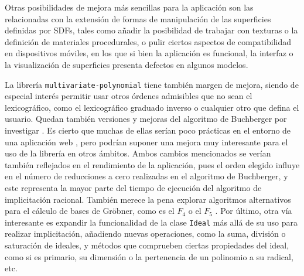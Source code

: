 Otras posibilidades de mejora más sencillas para la aplicación son las relacionadas con la extensión de formas de manipulación de las superficies definidas por SDFs, tales como añadir la posibilidad de trabajar con texturas o la definición de materiales procedurales, o pulir ciertos aspectos de compatibilidad en dispositivos móviles, en los que si bien la aplicación es funcional, la interfaz o la visualización de superficies presenta defectos en algunos modelos.\newline

La librería \texttt{multivariate-polynomial} tiene también margen de mejora, siendo de especial interés permitir usar otros órdenes admisibles que no sean el lexicográfico, como el lexicográfico graduado inverso o cualquier otro que defina el usuario. Quedan también versiones y mejoras del algoritmo de Buchberger por investigar \cite{conc1,conc2,conc3,conc4}. Es cierto que muchas de ellas serían poco prácticas en el entorno de una aplicación web \cite{conc5}, pero podrían suponer una mejora muy interesante para el uso de la librería en otros ámbitos. Ambos cambios mencionados se verían también reflejados en el rendimiento de la aplicación, pues el orden elegido influye en el número de reducciones a cero realizadas en el algoritmo de Buchberger, y este representa la mayor parte del tiempo de ejecución del algoritmo de implicitación racional. También merece la pena explorar algoritmos alternativos para el cálculo de bases de Gröbner, como es el $F_4$ o el $F_5$ \cite{conc6, conc7}. Por último, otra vía interesante es expandir la funcionalidad de la clase \texttt{Ideal} más allá de su uso para realizar implicitación, añadiendo nuevas operaciones, como la suma, división o saturación de ideales, y métodos que comprueben ciertas propiedades del ideal, como si es primario, su dimensión o la pertenencia de un polinomio a su radical, etc.